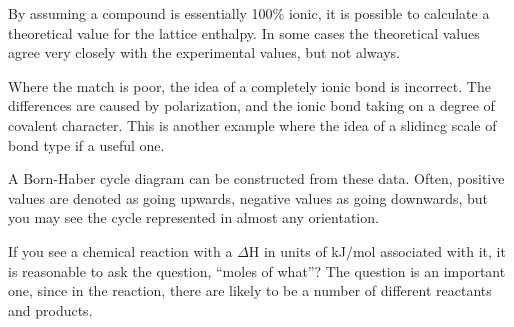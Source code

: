 \documentclass[../chem.tex]{subfiles}
\begin{document}
By assuming a compound is essentially 100\% ionic, it is possible to calculate a theoretical value for the lattice enthalpy. In some cases 
the theoretical values agree very closely with the experimental values, but not always.

Where the match is poor, the idea of a completely ionic bond is incorrect. The differences are caused by polarization, and the ionic bond taking on a degree of covalent character.
This is another example where the idea of a slidincg scale of bond type if a useful one.

A Born-Haber cycle diagram can be constructed from these data. Often, positive values are denoted as going upwards, negative values as going downwards, but you may see the cycle represented in almost any orientation.

If you see a chemical reaction with a $\Delta$H in units of kJ/mol associated with it, it is reasonable to ask the question, ``moles of what''?
The question is an important one, since in the reaction, there are likely to be a number of different reactants and products. 
\end{document}
